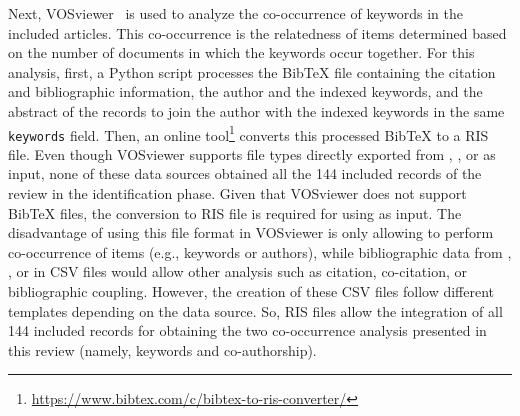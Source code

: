 Next, VOSviewer~\parencite{results:vosviewer:1,results:vosviewer:2} is used to analyze the co-occurrence of keywords in the included articles. This co-occurrence is the relatedness of items determined based on the number of documents in which the keywords occur together.
For this analysis, first, a Python script processes the BibTeX file containing the citation and bibliographic information, the author and the indexed keywords, and the abstract of the records to join the author with the indexed keywords in the same \texttt{keywords} field. Then, an online tool\footnote{\url{https://www.bibtex.com/c/bibtex-to-ris-converter/}} converts this processed BibTeX to a RIS file.
Even though VOSviewer supports file types directly exported from , , or  as input, none of these data sources obtained all the 144 included records of the review in the identification phase. Given that VOSviewer does not support BibTeX files, the conversion to RIS file is required for using as input.
The disadvantage of using this file format in VOSviewer is only allowing to perform co-occurrence of items (e.g., keywords or authors), while bibliographic data from , , or  in CSV files would allow other analysis such as citation, co-citation, or bibliographic coupling.
However, the creation of these CSV files follow different templates depending on the data source. So, RIS files allow the integration of all 144 included records for obtaining the two co-occurrence analysis presented in this review (namely, keywords and co-authorship).


